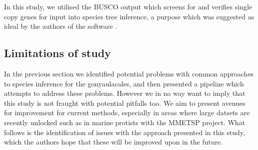 \documentclass[12pt]{article}
\begin{document}
In this study, we utilised the BUSCO output which screens for and verifies single copy genes for input into species tree inference, a purpose which was suggested as ideal by the authors of the software \cite{simao2015busco}. 

\subsection*{Limitations of study}
In the previous section we identified potential problems with common approaches to species inference for the gonyaulacales, and then presented a pipeline which attempts to address these problems. However we in no way want to imply that this study is not fraught with potential pitfalls too. We aim to present avenues for improvement for current methods, especially in areas where large datsets are recently unlocked such as in marine protists with the MMETSP project. %
What follows is the identification of issues with the approach presented in this study, which the authors hope that these will be improved upon in the future. 
\end{document}
